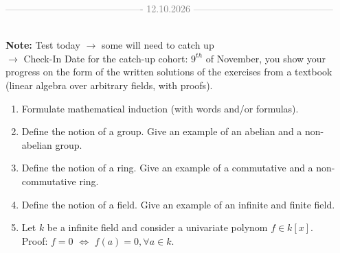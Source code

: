  
  \begin{center}
    \textcolor{gray}{------------------------------------------- 12.10.2026 --------------------------------------------} \\[0.3em]
  \end{center} \ \\[0.15em]  
  \textbf{Note:} Test today $\rightarrow$ some will need to catch up \\
   $\rightarrow$ Check-In Date for the catch-up cohort: $9^{th}$ of November, you show your progress on the form of the written 
  solutions of the exercises from a textbook (linear algebra over arbitrary fields, with proofs). 
  
\begin{exercise}[title = Entry Level Exercise]
  \begin{enumerate}
    \item Formulate mathematical induction (with words and/or formulas).  
    \item Define the notion of a group. Give an example of an abelian and a non-abelian group. 
    \item Define the notion of a ring. Give an example of a commutative and a non-commutative ring. 
    \item Define the notion of a field. Give an example of an infinite and finite field. 
    \item Let $k$ be a infinite field and consider a univariate polynom $f \in k[x]$. \\ 
    Proof: $f = 0$ $\Leftrightarrow$ $f(a) = 0, \forall a \in k$. 
  \end{enumerate}
\end{exercise} 

